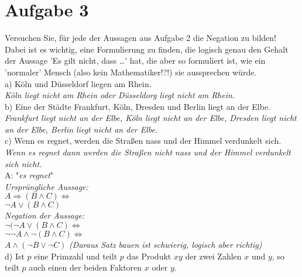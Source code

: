 \section*{Aufgabe 3}

Versuchen Sie, für jede der Aussagen aus Aufgabe 2 die Negation zu bilden!\\

Dabei ist es wichtig, eine Formulierung zu finden, die logisch genau den Gehalt der Aussage 'Es gilt nicht, dass \dots ' hat, die aber so formuliert ist, wie ein 'normaler' Mensch (also kein Mathematiker!?!) sie aussprechen würde.\\

a) Köln und Düsseldorf liegen am Rhein.\\

\textit{Köln liegt nicht am Rhein oder Düsseldorg liegt nicht am Rhein.}\\

b) Eine der Städte Frankfurt, Köln, Dresden und Berlin liegt an der Elbe.\\

\textit{Frankfurt liegt nicht an der Elbe, Köln liegt nicht an der Elbe, Dresden liegt nicht an der Elbe, Berlin liegt nicht an der Elbe.}\\

c) Wenn es regnet, werden die Straßen nass und der Himmel verdunkelt sich.\\

\textit{Wenn es regnet dann werden die Straßen nicht nass und der Himmel verdunkelt sich nicht.}\\

A: "\textit{es regnet}"\\

\textit{Ursprüngliche Aussage:}\\
$A \Rightarrow (B \land C) \Leftrightarrow$\\
$\lnot A \lor (B \land C)$\\

\textit{Negation der Aussage:}\\
$\lnot(\lnot A \lor (B \land C) \Leftrightarrow$\\
$\lnot \lnot A \land \lnot (B \land C) \Leftrightarrow$\\
$A \land (\lnot B \lor \lnot C)$ \textit{(Daraus Satz bauen ist schwierig, logisch aber richtig)}\\

d) Ist $p$ eine Primzahl und teilt $p$ das Produkt $xy$ der zwei Zahlen $x$ und $y$, so teilt $p$ auch einen der beiden Faktoren $x$ oder $y$.\\

